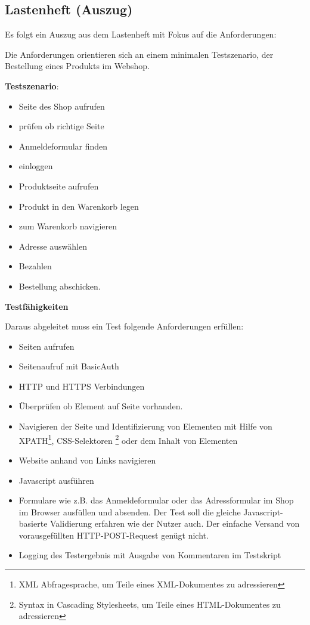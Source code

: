 \subsection{Lastenheft (Auszug)}
\label{app:Lastenheft}

Es folgt ein Auszug aus dem Lastenheft mit Fokus auf die Anforderungen:

Die Anforderungen orientieren sich an einem minimalen Testszenario, der
Bestellung eines Produkts im Webshop.

\textbf{Testszenario}:

\begin{itemize}
\itemsep1pt\parskip0pt
\item
  Seite des Shop aufrufen
\item
  prüfen ob richtige Seite
\item
  Anmeldeformular finden
\item
  einloggen
\item
  Produktseite aufrufen
\item
  Produkt in den Warenkorb legen
\item
  zum Warenkorb navigieren
\item
  Adresse auswählen
\item
  Bezahlen
\item
  Bestellung abschicken.
\end{itemize}

\textbf{Testfähigkeiten}

Daraus abgeleitet muss ein Test folgende Anforderungen erfüllen:

\begin{itemize}
\itemsep1pt\parskip0pt
\item
  Seiten aufrufen
\item
  Seitenaufruf mit BasicAuth
\item
  HTTP und HTTPS Verbindungen
\item
  Überprüfen ob Element auf Seite vorhanden.
\item
  Navigieren der Seite und Identifizierung von Elementen mit Hilfe von
  XPATH\footnote{XML Abfragesprache, um Teile eines XML-Dokumentes zu
    adressieren}, CSS-Selektoren \footnote{Syntax in Cascading
    Stylesheets, um Teile eines HTML-Dokumentes zu adressieren } oder
  dem Inhalt von Elementen
\item
  Website anhand von Links navigieren
\item
  Javascript ausführen
\item
  Formulare wie z.B. das Anmeldeformular oder das Adressformular im Shop
  im Browser ausfüllen und absenden. Der Test soll die gleiche
  Javascript-basierte Validierung erfahren wie der Nutzer auch. Der
  einfache Versand von vorausgefüllten HTTP-POST-Request genügt nicht. 
\item
  Logging des Testergebnis mit Ausgabe von Kommentaren im Testskript
\end{itemize}

